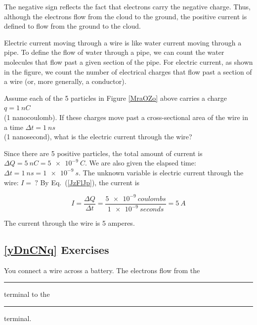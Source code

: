 \documentclass[main.tex]{subfiles}
\begin{document}
The negative sign reflects the fact that electrons carry the negative charge. Thus, although the electrons flow from the cloud to the ground, the positive current is defined to flow from the ground to the cloud.
\vspace{1em}

\cyanhrule


Electric current moving through a wire is like water current moving through a pipe. To define the flow of water through a pipe, we can count the water molecules that flow past a given section of the pipe. For electric current, as shown in the figure, we count the number of electrical charges that flow past a section of a wire (or, more generally, a conductor).

\vspace{1em}
\cyanhrule

\begin{example}
    Assume each of the 5 particles in Figure \ref{MraOZo} above carries a charge $q = \qty{1}{nC}$\\ (1 nanocoulomb). If these charges move past a cross-sectional area of the wire in a time  $\Delta{t} = \qty{1}{ns}$\\ (1 nanosecond), what is the electric current through the wire?
\end{example}

\Solution Since there are 5 positive particles, the total amount of current is $\Delta{Q} = \qty{5}{nC} = \qty{5e-9}{C}$. We are also given the elapsed time: $\Delta{t} = \qty{1}{ns} = \qty{1e-9}{s}$. The unknown variable is electric current through the wire: $I =\ ?$ By Eq.~(\ref{JzFlJp}), the current is

\begin{equation*}
    I = \frac{\Delta{Q}}{\Delta{t}} = \frac{\qty{5e-9}{coulombs}}{\qty{1e-9}{seconds}} = \qty{5}{A}
\end{equation*}

The current through the wire is 5 amperes.

\vspace{1em}

\cyanhrule


\clearpage
\subsection*{\ref{yDnCNq} Exercises}

\begin{exercise}
    You connect a wire across a battery. The electrons flow from the \rule{2cm}{0.15mm} terminal to the \rule{2cm}{0.15mm} terminal.
\end{exercise}
\end{document}
